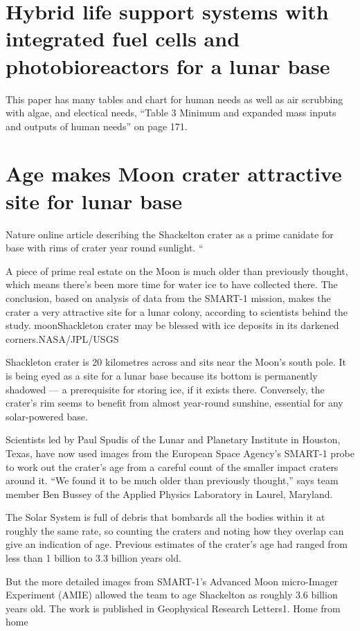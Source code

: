 \documentclass[prl,onecolumn]{revtex4-1}  %
\begin{document}
\section{Hybrid life support systems with integrated fuel cells and photobioreactors for a lunar base}
This paper has many tables and chart for human needs as well as air scrubbing with algae, and electical needs, ``Table 3 Minimum and expanded mass inputs and outputs of human needs'' on page 171. \citep{Belz}


\section{Age makes Moon crater attractive site for lunar base}
Nature online article describing the Shackelton crater as a prime canidate for base with rims of crater year round sunlight.
``

A piece of prime real estate on the Moon is much older than previously thought, which means there’s been more time for water ice to have collected there. The conclusion, based on analysis of data from the SMART-1 mission, makes the crater a very attractive site for a lunar colony, according to scientists behind the study.
moonShackleton crater may be blessed with ice deposits in its darkened corners.NASA/JPL/USGS

Shackleton crater is 20 kilometres across and sits near the Moon’s south pole. It is being eyed as a site for a lunar base because its bottom is permanently shadowed — a prerequisite for storing ice, if it exists there. Conversely, the crater's rim seems to benefit from almost year-round sunshine, essential for any solar-powered base.

Scientists led by Paul Spudis of the Lunar and Planetary Institute in Houston, Texas, have now used images from the European Space Agency’s SMART-1 probe to work out the crater’s age from a careful count of the smaller impact craters around it. “We found it to be much older than previously thought,” says team member Ben Bussey of the Applied Physics Laboratory in Laurel, Maryland.

The Solar System is full of debris that bombards all the bodies within it at roughly the same rate, so counting the craters and noting how they overlap can give an indication of age. Previous estimates of the crater’s age had ranged from less than 1 billion to 3.3 billion years old.

But the more detailed images from SMART-1's Advanced Moon micro-Imager Experiment (AMIE) allowed the team to age Shackelton as roughly 3.6 billion years old. The work is published in Geophysical Research Letters1.
Home from home
\end{document}
